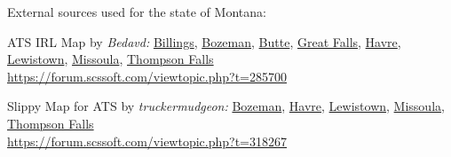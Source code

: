 


%
%






%

%



\vspace{2em}\footnoterule
{\footnotesize \noindent External sources used for the state of Montana:
\begin{description}[
	style=nextline,
	leftmargin=1.1em,
	labelsep=0pt,
	parsep=0pt,
	font=\normalfont,
]

\item[$\ast$]
ATS IRL Map by \textit{Bedavd:}
\hyperref[city:Billings]{Billings},
\hyperref[city:Bozeman]{Bozeman},
\hyperref[city:Butte]{Butte},
\hyperref[city:Great Falls]{Great Falls},
\hyperref[city:Havre]{Havre},
\hyperref[city:Lewistown]{Lewistown},
\hyperref[city:Missoula]{Missoula},
\hyperref[city:Thompson Falls]{Thompson Falls}
\\ \url{https://forum.scssoft.com/viewtopic.php?t=285700}

\item[$\dagger$]
Slippy Map for ATS by \textit{truckermudgeon:}
\hyperref[city:Bozeman]{Bozeman},
\hyperref[city:Havre]{Havre},
\hyperref[city:Lewistown]{Lewistown},
\hyperref[city:Missoula]{Missoula},
\hyperref[city:Thompson Falls]{Thompson Falls}
\\ \url{https://forum.scssoft.com/viewtopic.php?t=318267}

\end{description}
}
